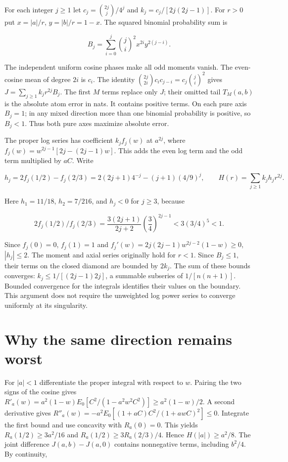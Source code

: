 For each integer \(j\ge1\) let \(c_j=\binom{2j}{j}/4^j\) and \(k_j=c_j/[2j(2j-1)]\). For \(r>0\) put \(x=|a|/r\), \(y=|b|/r=1-x\). The squared binomial probability sum is

\[
B_j=\sum_{i=0}^j\binom ji^{\!2} x^{2i}y^{2(j-i)}.
\]

The independent uniform cosine phases make all odd moments vanish. The even-cosine mean of degree \(2i\) is \(c_i\). The identity \(\binom{2j}{2i}c_i c_{j-i}=c_j\binom ji^2\) gives \(J=\sum_{j\ge1}k_jr^{2j}B_j\). The first \(M\) terms replace only \(J\); their omitted tail \(T_M(a,b)\) is the absolute atom error in nats. It contains positive terms. On each pure axis \(B_j=1\); in any mixed direction more than one binomial probability is positive, so \(B_j<1\). Thus both pure axes maximize absolute error.

The proper log series has coefficient \(k_j f_j(w)\) at \(a^{2j}\), where \(f_j(w)=w^{2j-1}[2j-(2j-1)w]\). This adds the even log term and the odd term multiplied by \(aC\). Write

\[
h_j=2f_j(1/2)-f_j(2/3)=2(2j+1)4^{-j}-(j+1)(4/9)^j,\qquad H(r)=\sum_{j\ge1}k_jh_jr^{2j}.
\]

Here \(h_1=11/18\), \(h_2=7/216\), and \(h_j<0\) for \(j\ge3\), because

\[
2f_j(1/2)/f_j(2/3)=\frac{3(2j+1)}{2j+2}\left(\frac34\right)^{2j-1}<3(3/4)^5<1.
\]

Since \(f_j(0)=0\), \(f_j(1)=1\) and \(f_j'(w)=2j(2j-1)w^{2j-2}(1-w)\ge0\), \(|h_j|\le2\). The moment and axial series originally hold for \(r<1\). Since \(B_j\le1\), their terms on the closed diamond are bounded by \(2k_j\). The sum of these bounds converges: \(k_j\le1/[(2j-1)2j]\), a summable subseries of \(1/[n(n+1)]\). Bounded convergence for the integrals identifies their values on the boundary. This argument does not require the unweighted log power series to converge uniformly at its singularity.

\clearpage

\section{Why the same direction remains worst}\label{why-the-same-direction-remains-worst}

For \(|a|<1\) differentiate the proper integral with respect to \(w\). Pairing the two signs of the cosine gives \(R'_a(w)=a^2(1-w)E_0[C^2/(1-a^2w^2C^2)]\ge a^2(1-w)/2\). A second derivative gives \(R''_a(w)=-a^2E_0[(1+aC)C^2/(1+awC)^2]\le0\). Integrate the first bound and use concavity with \(R_a(0)=0\). This yields \(R_a(1/2)\ge3a^2/16\) and \(R_a(1/2)\ge3R_a(2/3)/4\). Hence \(H(|a|)\ge a^2/8\). The joint difference \(J(a,b)-J(a,0)\) contains nonnegative terms, including \(b^2/4\). By continuity,

